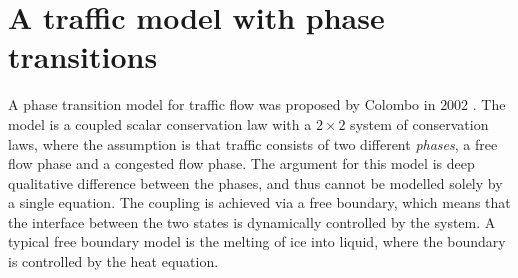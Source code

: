 \documentclass[10pt]{article}
\numberwithin{equation}{section}
\begin{document}
\newpage
\section{A traffic model with phase transitions}
A phase transition model for traffic flow was proposed by Colombo in $2002$ \cite{Colombo2003}. The model is a coupled scalar conservation law with a $2 \times 2$ system of conservation laws, where the assumption is that traffic consists of two different \textit{phases}, a free flow phase and a congested flow phase. The argument for this model is deep qualitative difference between the phases, and thus cannot be modelled solely by a single equation. The coupling is achieved via a free boundary, which means that the interface between the two states is dynamically controlled by the system. A typical free boundary model is the melting of ice into liquid, where the boundary is controlled by the heat equation. 
\end{document}
